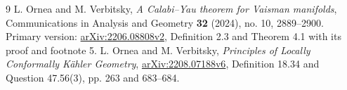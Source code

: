 \documentclass[11pt]{article}
\theoremstyle{remark}\newtheorem{remark}[theorem]{Remark}
\begin{document}
\begin{thebibliography}{9}
 L. Ornea and M. Verbitsky,
\emph{A Calabi--Yau theorem for Vaisman manifolds},
Communications in Analysis and Geometry \textbf{32} (2024),
no. 10, 2889--2900. Primary version:
\href{https://arxiv.org/abs/2206.08808v2}{arXiv:2206.08808v2},
Definition 2.3 and Theorem 4.1 with its proof and footnote 5.
 L. Ornea and M. Verbitsky,
\emph{Principles of Locally Conformally K\"ahler Geometry},
\href{https://arxiv.org/abs/2208.07188v6}{arXiv:2208.07188v6},
Definition 18.34 and Question 47.56(3), pp. 263 and 683--684.
\end{thebibliography}
\end{document}
